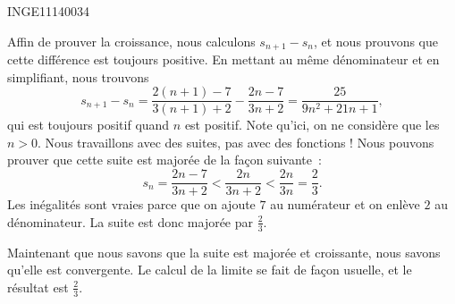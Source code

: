 \documentclass{article}
\begin{document}
\begin{corrige}{INGE11140034}

	Affin de prouver la croissance, nous calculons $s_{n+1}-s_n$, et nous prouvons que cette différence est toujours positive. En mettant au même dénominateur et en simplifiant, nous trouvons
	\begin{equation}
		s_{n+1}-s_n=\frac{ 2(n+1)-7 }{ 3(n+1)+2 }-\frac{ 2n-7 }{ 3n+2 }=\frac{ 25 }{ 9n^2+21n+1 },
	\end{equation}
	qui est toujours positif quand $n$ est positif. Note qu'ici, on ne considère que les $n>0$. Nous travaillons avec des suites, pas avec des fonctions !
	Nous pouvons prouver que cette suite est majorée de la façon suivante~:
	\begin{equation}
		s_n=\frac{ 2n-7 }{ 3n+2 }<\frac{ 2n }{ 3n+2 }<\frac{ 2n }{ 3n }=\frac{ 2 }{ 3 }.
	\end{equation}
	Les inégalités sont vraies parce que on ajoute $7$ au numérateur et on enlève $2$ au dénominateur. La suite est donc majorée par $\frac{ 2 }{ 3 }$.

	Maintenant que nous savons que la suite est majorée et croissante, nous savons qu'elle est convergente. Le calcul de la limite se fait de façon usuelle, et le résultat est $\frac{ 2 }{ 3 }$.

\end{corrige}
\end{document}
